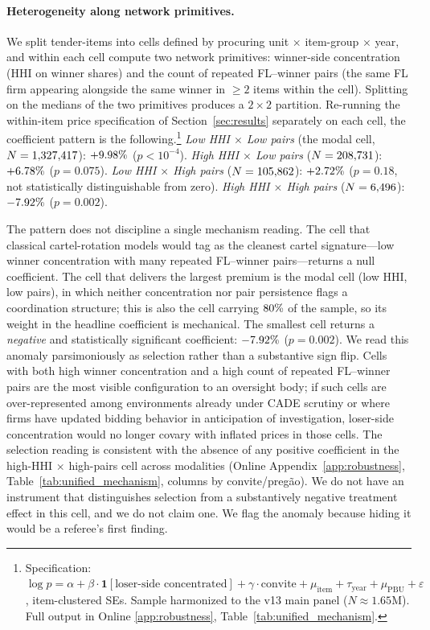 \paragraph{Heterogeneity along network primitives.}
We split tender-items into cells defined by procuring unit
$\times$ item-group $\times$ year, and within each cell compute
two network primitives: winner-side concentration (HHI on
winner shares) and the count of repeated FL--winner pairs (the
same FL firm appearing alongside the same winner in $\geq 2$
items within the cell). Splitting on the medians of the two
primitives produces a $2 \times 2$ partition. Re-running the
within-item price specification of
Section~\ref{sec:results} separately on each cell, the
coefficient pattern is the following.\footnote{Specification:
$\log p = \alpha + \beta \cdot \mathbf{1}[\text{loser-side concentrated}] + \gamma \cdot \text{convite} + \mu_{\text{item}} + \tau_{\text{year}} + \mu_{\text{PBU}} + \varepsilon$, item-clustered SEs.
Sample harmonized to the v13 main panel ($N \approx 1.65\text{M}$).
Full output in Online \ref{app:robustness}, Table~\ref{tab:unified_mechanism}.}
\emph{Low HHI $\times$ Low pairs} (the modal cell, $N =
1{,}327{,}417$): $+9.98\%$ ($p < 10^{-4}$). \emph{High HHI
$\times$ Low pairs} ($N = 208{,}731$): $+6.78\%$ ($p =
0.075$). \emph{Low HHI $\times$ High pairs} ($N = 105{,}862$):
$+2.72\%$ ($p = 0.18$, not statistically distinguishable from
zero). \emph{High HHI $\times$ High pairs} ($N = 6{,}496$):
$-7.92\%$ ($p = 0.002$).

The pattern does not discipline a single mechanism reading.
The cell that classical cartel-rotation models would tag as
the cleanest cartel signature---low winner concentration with
many repeated FL--winner pairs---returns a null coefficient.
The cell that delivers the largest premium is the modal cell
(low HHI, low pairs), in which neither concentration nor
pair persistence flags a coordination structure; this is also
the cell carrying $80\%$ of the sample, so its weight in
the headline coefficient is mechanical. The smallest cell
returns a \emph{negative} and statistically significant
coefficient: $-7.92\%$ ($p = 0.002$). We read this anomaly
parsimoniously as selection rather than a substantive sign
flip. Cells with both high winner concentration and a
high count of repeated FL--winner pairs are the most visible
configuration to an oversight body; if such cells are over-represented
among environments already under CADE scrutiny or where firms
have updated bidding behavior in anticipation of investigation,
loser-side concentration would no longer covary with inflated
prices in those cells. The selection reading is consistent
with the absence of any positive coefficient in the high-HHI
$\times$ high-pairs cell across modalities (Online
Appendix~\ref{app:robustness}, Table~\ref{tab:unified_mechanism},
columns by convite/preg\~ao). We do not have an instrument
that distinguishes selection from a substantively negative
treatment effect in this cell, and we do not claim one. We
flag the anomaly because hiding it would be a referee's first
finding.

